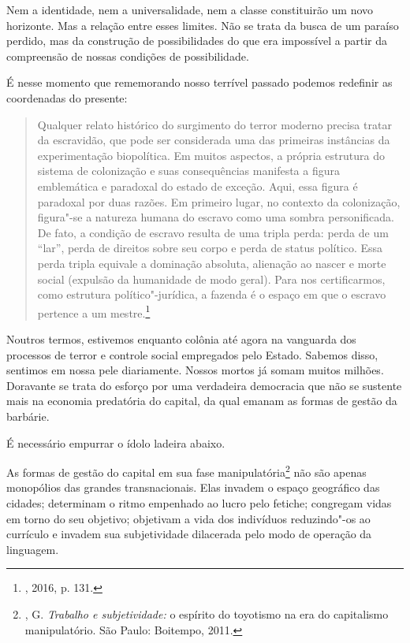 Nem a identidade, nem a universalidade, nem a classe constituirão um
novo horizonte. Mas a relação entre esses limites. Não se trata da busca
de um paraíso perdido, mas da construção de possibilidades do que era
impossível a partir da compreensão de nossas condições de possibilidade.

É nesse momento que rememorando nosso terrível passado podemos redefinir
as coordenadas do presente:

\begin{quote}
Qualquer relato histórico do surgimento do terror moderno precisa tratar
da escravidão, que pode ser considerada uma das primeiras instâncias da
experimentação biopolítica. Em muitos aspectos, a própria estrutura do
sistema de colonização e suas consequências manifesta a figura
emblemática e paradoxal do estado de exceção. Aqui, essa figura é
paradoxal por duas razões. Em primeiro lugar, no contexto da
colonização, figura"-se a natureza humana do escravo como uma sombra
personificada. De fato, a condição de escravo resulta de uma tripla
perda: perda de um ``lar'', perda de direitos sobre seu corpo e perda de
status político. Essa perda tripla equivale a dominação absoluta,
alienação ao nascer e morte social (expulsão da humanidade de modo
geral). Para nos certificarmos, como estrutura político"-jurídica, a
fazenda é o espaço em que o escravo pertence a um mestre.\footnote{,
  2016, p. 131.}
\end{quote}

Noutros termos, estivemos enquanto colônia até agora na vanguarda dos
processos de terror e controle social empregados pelo Estado. Sabemos
disso, sentimos em nossa pele diariamente. Nossos mortos já somam muitos
milhões. Doravante se trata do esforço por uma verdadeira democracia que
não se sustente mais na economia predatória do capital, da qual emanam
as formas de gestão da barbárie.

É necessário empurrar o ídolo ladeira abaixo.

As formas de gestão do capital em sua fase manipulatória\footnote{,
  G. \emph{Trabalho e subjetividade:} o espírito do toyotismo na era do
  capitalismo manipulatório. São Paulo: Boitempo, 2011.} não são apenas
monopólios das grandes transnacionais. Elas invadem o espaço geográfico
das cidades; determinam o ritmo empenhado ao lucro pelo fetiche;
congregam vidas em torno do seu objetivo; objetivam a vida dos
indivíduos reduzindo"-os ao currículo e invadem sua subjetividade
dilacerada pelo modo de operação da linguagem.

